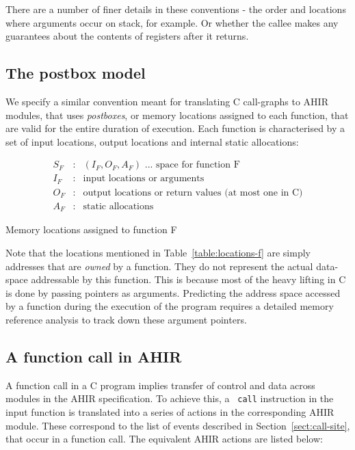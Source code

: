 \documentclass[12pt]{article}
\begin{document}
There are a number of finer details in these conventions - the order
and locations where arguments occur on stack, for example. Or whether
the callee makes any guarantees about the contents of registers after
it returns.

\subsection{The postbox model}

We specify a similar convention meant for translating C call-graphs to
AHIR modules, that uses {\it postboxes}, or memory locations assigned
to each function, that are valid for the entire duration of execution.
Each function is characterised by a set of input locations, output
locations and internal static allocations:

\begin{table}[htb]
\small
\begin{eqnarray*}
S_F & : & (I_F, O_F, A_F) \mbox{ ... space for function F}\\
I_F & : & \mbox{input locations or arguments}\\
O_F & : & \mbox{output locations or return values (at most one in C)}\\
A_F & : & \mbox{static allocations}
\end{eqnarray*}
\caption{Memory locations assigned to function F}
\label{table:locations-f}
\end{table}

Note that the locations mentioned in Table~\ref{table:locations-f} are
simply addresses that are {\it owned} by a function. They do not
represent the actual data-space addressable by this function. This is
because most of the heavy lifting in C is done by passing pointers as
arguments. Predicting the address space accessed by a function during
the execution of the program requires a detailed memory reference
analysis to track down these argument pointers.

\subsection{A function call in AHIR}
\label{sect:ahir-function-call}

A function call in a C program implies transfer of control and data
across modules in the AHIR specification. To achieve this, a {\tt
call} instruction in the input function is translated into a series of
actions in the corresponding AHIR module. These correspond to the list
of events described in Section~\ref{sect:call-site}, that occur in a
function call. The equivalent AHIR actions are listed below:
\end{document}
